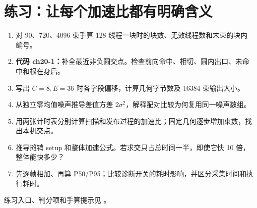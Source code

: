 \section{练习：让每个加速比都有明确含义}
\begin{enumerate}
\item 对 90、720、4096 束手算 128 线程一块时的块数、无效线程数和末束的块内编号。
\item \textbf{代码 ch20-1：}补全最近非负圆交点。检查前向命中、相切、圆内出口、未命中和根在身后。
\item 写出 $C=8,E=36$ 时各字段偏移，计算几何字节数及 16384 束输出大小。
\item 从独立零均值噪声推导差值方差 $2\sigma^2$，解释配对比较为何复用同一噪声数组。
\item 用两张计时表分别计算扫描和发布过程的加速比；固定几何逐步增加束数，找出本机交点。
\item 推导摊销 setup 和整体加速公式。若求交只占总时间一半，即使它快 10 倍，整体能快多少？
\item 先逐帧相加、再算 P50/P95；比较诊断开关的耗时影响，并区分采集时间和执行耗时。
\end{enumerate}
练习入口、判分项和手算提示见 。
